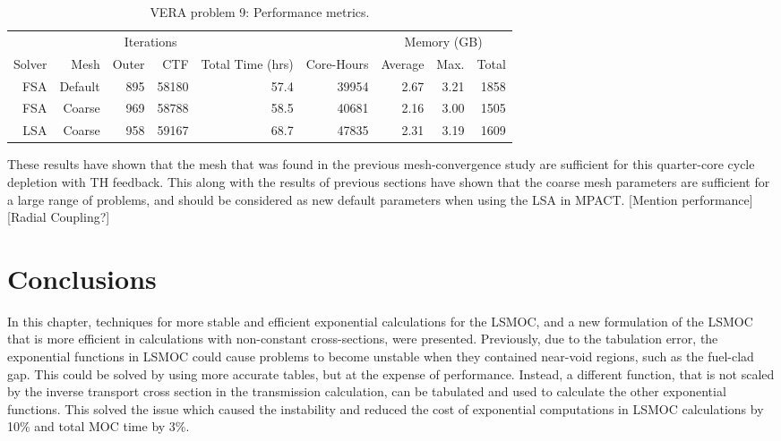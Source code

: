 {{{      \begin{table}[htbp]
        \centering
        \caption{VERA problem 9: Performance metrics.\label{tab:LSMOC:P9:Performance}}
        \begin{tabular}{rrrrrrrrr}\toprule
                 &      & \multicolumn{2}{c}{Iterations} & & & \multicolumn{3}{c}{Memory (GB)}\\\cline{3-4}\cline{7-9}
          Solver & Mesh    & Outer &   CTF & Total Time (hrs) & Core-Hours & Average & Max. & Total\\\midrule
             FSA & Default &   895 & 58180 &            57.4  &      39954 &    2.67 & 3.21 & 1858\\
             FSA &  Coarse &   969 & 58788 &            58.5  &      40681 &    2.16 & 3.00 & 1505\\
             LSA &  Coarse &   958 & 59167 &            68.7  &      47835 &    2.31 & 3.19 & 1609\\\bottomrule
        \end{tabular}
      \end{table}

      These results have shown that the mesh that was found in the previous mesh-convergence study are sufficient for this quarter-core cycle depletion with \ac{TH} feedback.
      This along with the results of previous sections have shown that the coarse mesh parameters are sufficient for a large range of problems, and should be considered as new default parameters when using the \ac{LSA} in MPACT.
      [Mention performance]
      [Radial Coupling?]
    }
  }
  \section{Conclusions}{\label{sec:Conclusions}
    In this chapter, techniques for more stable and efficient exponential calculations for the \ac{LSMOC}, and a new formulation of the \ac{LSMOC} that is more efficient in calculations with non-constant cross-sections, were presented.
    Previously, due to the tabulation error, the exponential functions in \ac{LSMOC} could cause problems to become unstable when they contained near-void regions, such as the fuel-clad gap.
    This could be solved by using more accurate tables, but at the expense of performance.
    Instead, a different function, that is not scaled by the inverse transport cross section in the transmission calculation, can be tabulated and used to calculate the other exponential functions.
    This solved the issue which caused the instability and reduced the cost of exponential computations in \ac{LSMOC} calculations by 10\% and total \ac{MOC} time by 3\%.

}}
